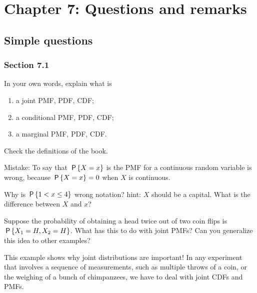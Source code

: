 




\chapter{Chapter 7: Questions and remarks}
\label{cha:questions-chapter-7}


\section{Simple questions}

\subsection*{Section 7.1}


\begin{exercise}
In your own words, explain what is
\begin{enumerate}
\item a joint PMF, PDF, CDF;
\item a conditional PMF, PDF, CDF;
\item a marginal PMF, PDF, CDF.
\end{enumerate}
\begin{solution}
Check the definitions of the book.

Mistake: To say that $\P{X=x}$ is the PMF for a continuous random variable is wrong, because $\P{X=x}=0$ when $X$ is continuous.

Why is $\P{1 < x \leq 4}$ wrong notation?
hint: $X$ should be a capital.
What is the difference between $X$ and $x$?

\end{solution}
\end{exercise}

\begin{exercise}
Suppose the probability of obtaining a head twice out of two coin flips is $\P{X_1=H, X_2=H}$.
What has this to do with joint PMFs? Can you generalize this idea to other examples?
\begin{solution}
This example shows why joint distributions are important!
In any experiment that involves a sequence of measurements, such as multiple throws of a coin, or the weighing of a bunch of chimpanzees, we have to deal with joint CDFs and PMFs.
\end{solution}
\end{exercise}


